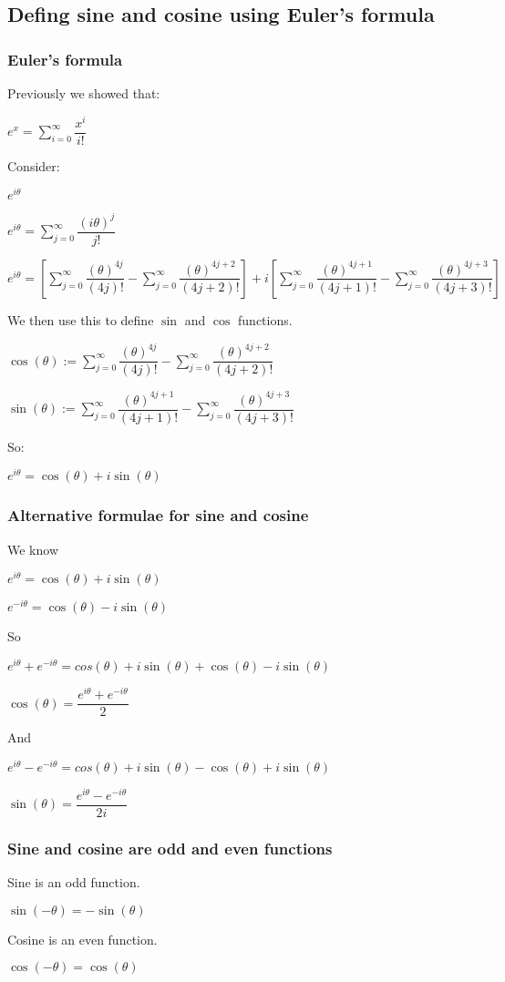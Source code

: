 
\subsection{Defing sine and cosine using Euler's formula}

\subsubsection{Euler's formula}

Previously we showed that:

\(e^x=\sum_{i=0}^\infty \dfrac{x^i}{i!}\)

Consider:

\(e^{i\theta }\)

\(e^{i\theta }=\sum_{j=0}^\infty \dfrac{(i\theta )^j}{j!}\)

\(e^{i\theta }=[\sum_{j=0}^\infty \dfrac{(\theta )^{4j}}{(4j)!}-\sum_{j=0}^\infty \dfrac{(\theta )^{4j+2}}{(4j+2)!}]+i[\sum_{j=0}^\infty \dfrac{(\theta )^{4j+1}}{(4j+1)!}-\sum_{j=0}^\infty \dfrac{(\theta )^{4j+3}}{(4j+3)!}]\)

We then use this to define \(\sin \) and \(\cos \) functions.

\(\cos (\theta ):=\sum_{j=0}^\infty \dfrac{(\theta )^{4j}}{(4j)!}-\sum_{j=0}^\infty \dfrac{(\theta )^{4j+2}}{(4j+2)!}\)

\(\sin (\theta ):=\sum_{j=0}^\infty \dfrac{(\theta )^{4j+1}}{(4j+1)!}-\sum_{j=0}^\infty \dfrac{(\theta )^{4j+3}}{(4j+3)!}\)

So:

\(e^{i\theta }=\cos (\theta )+i\sin (\theta )\)

\subsubsection{Alternative formulae for sine and cosine}

We know

\(e^{i\theta }=\cos (\theta )+i\sin (\theta )\)

\(e^{-i\theta }=\cos (\theta )-i\sin (\theta )\)

So

\(e^{i\theta }+e^{-i\theta }=cos (\theta )+i\sin (\theta )+\cos (\theta )-i\sin (\theta )\)

\(\cos (\theta )=\dfrac{e^{i\theta }+e^{-i\theta }}{2}\)

And

\(e^{i\theta }-e^{-i\theta }=cos (\theta )+i\sin (\theta )-\cos (\theta )+i\sin (\theta )\)

\(\sin (\theta )=\dfrac{e^{i\theta }-e^{-i\theta }}{2i}\)

\subsubsection{Sine and cosine are odd and even functions}

Sine is an odd function.

\(\sin (-\theta )=-\sin (\theta )\)

Cosine is an even function.

\(\cos (-\theta )=\cos (\theta )\)

